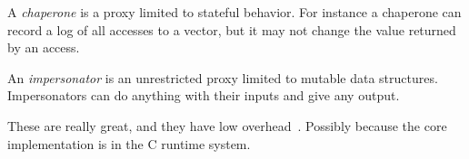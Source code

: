 \documentclass{article}
\begin{document}

A \emph{chaperone} is a proxy limited to stateful behavior.
For instance a chaperone can record a log of all accesses to a vector, but it may not change the value returned by an access.

An \emph{impersonator} is an unrestricted proxy limited to mutable data structures.
Impersonators can do anything with their inputs and give any output.

These are really great, and they have low overhead~\cite{stff-chaperones}.
Possibly because the core implementation is in the C runtime system.

\footnotesize


\end{document}
